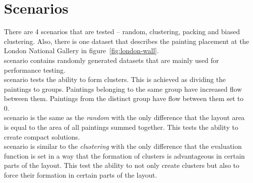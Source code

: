 \section{Scenarios}\label{sec:scenarios}

There are 4 scenarios that are tested – random, clustering, packing and biased clustering.
Also, there is one dataset that describes the painting placement at the London National Gallery in figure~\ref{fig:london-wall}. \\

 scenario contains randomly generated datasets that are mainly used for performance testing.\\

 scenario tests the ability to form clusters.
This is achieved as dividing the paintings to groups. Paintings belonging to the
same group have increased flow between them. Paintings from the distinct group have flow between
them set to 0. \\

 scenario is the same as the \textit{random} with the only difference that the layout area
is equal to the area of all paintings summed together. This tests the ability to create compact solutions.\\

 scenario is similar to the \textit{clustering} with the only difference
that the evaluation function is set in a way that the formation of clusters is advantageous in certain parts
of the layout. This test the ability to not only create clusters but also to force their formation in certain parts of the layout.\\